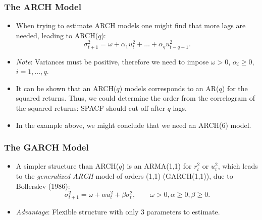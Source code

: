 \begin{frame}%
\frametitle{The ARCH Model}

\begin{itemize}
\item When trying to estimate ARCH models one might find that more lags are
needed, leading to ARCH($q$):%
\begin{equation*}
\sigma _{t+1}^{2}=\omega +\alpha _{1}u_{t}^{2}+\ldots +\alpha
_{q}u_{t-q+1}^{2}.
\end{equation*}

\item \emph{Note}: Variances must be positive, therefore we need to impose $%
\omega >0$, $\alpha _{i}\geq 0$, $i=1,\ldots ,q$.
\item It can be shown that an ARCH($q$) models corresponds to an AR($q$) for the squared returns. Thus, we could determine the order from the correlogram of the squared returns: SPACF should cut off after $q$ lags.
\item In the example above, we might conclude that we need an ARCH(6) model.
\end{itemize}

\end{frame}%

\begin{frame}%

\frametitle{The GARCH Model}

\begin{itemize}
\item A simpler structure than ARCH($q$) is an ARMA(1,1) for $r_{t}^{2}$ or $%
u_{t}^{2}$, which leads to the \emph{\color{red}generalized ARCH} model of
orders (1,1) \linebreak(GARCH(1,1)), due to Bollerslev (1986):
\begin{equation*}
\sigma _{t+1}^{2}=\omega +\alpha u_{t}^{2}+\beta \sigma _{t}^{2},\qquad
\omega >0,\alpha \geq 0,\beta \geq 0.
\end{equation*}


\item \emph{Advantage}: Flexible structure with only 3 parameters
to estimate.
\end{itemize}

\end{frame}%

